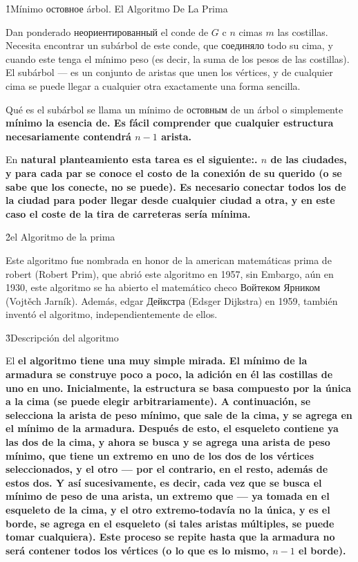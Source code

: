 \h1{Mínimo остовное árbol. El Algoritmo De La Prima}

Dan ponderado неориентированный el conde de $G$ c $n$ cimas $m$ las costillas. Necesita encontrar un subárbol de este conde, que соединяло todo su cima, y cuando este tenga el mínimo peso (es decir, la suma de los pesos de las costillas). El subárbol --- es un conjunto de aristas que unen los vértices, y de cualquier cima se puede llegar a cualquier otra exactamente una forma sencilla.

Qué es el subárbol se llama un mínimo de остовным de un árbol o simplemente \bf{mínimo la esencia de}. Es fácil comprender que cualquier estructura necesariamente contendrá $n-1$ arista.

En \bf{natural planteamiento} esta tarea es el siguiente:. $n$ de las ciudades, y para cada par se conoce el costo de la conexión de su querido (o se sabe que los conecte, no se puede). Es necesario conectar todos los de la ciudad para poder llegar desde cualquier ciudad a otra, y en este caso el coste de la tira de carreteras sería mínima.


\h2{el Algoritmo de la prima}

Este algoritmo fue nombrada en honor de la american matemáticas prima de robert (Robert Prim), que abrió este algoritmo en 1957, sin Embargo, aún en 1930, este algoritmo se ha abierto el matemático checo Войтеком Ярником (Vojtěch Jarník). Además, edgar Дейкстра (Edsger Dijkstra) en 1959, también inventó el algoritmo, independientemente de ellos.


\h3{Descripción del algoritmo}

El \bf{el algoritmo} tiene una muy simple mirada. El mínimo de la armadura se construye poco a poco, la adición en él las costillas de uno en uno. Inicialmente, la estructura se basa compuesto por la única a la cima (se puede elegir arbitrariamente). A continuación, se selecciona la arista de peso mínimo, que sale de la cima, y se agrega en el mínimo de la armadura. Después de esto, el esqueleto contiene ya las dos de la cima, y ahora se busca y se agrega una arista de peso mínimo, que tiene un extremo en uno de los dos de los vértices seleccionados, y el otro --- por el contrario, en el resto, además de estos dos. Y así sucesivamente, es decir, cada vez que se busca el mínimo de peso de una arista, un extremo que --- ya tomada en el esqueleto de la cima, y el otro extremo-todavía no la única, y es el borde, se agrega en el esqueleto (si tales aristas múltiples, se puede tomar cualquiera). Este proceso se repite hasta que la armadura no será contener todos los vértices (o lo que es lo mismo, $n-1$ el borde).

